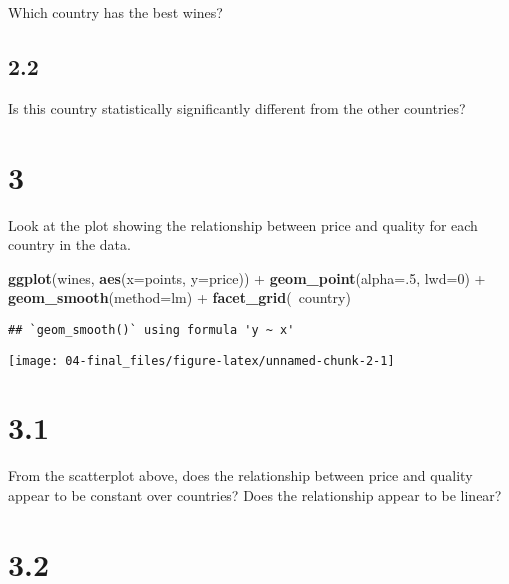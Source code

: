 \documentclass[]{tufte-handout}
\newenvironment{Shaded}{}{}
\newcommand{\DataTypeTok}[1]{\textcolor[rgb]{0.56,0.13,0.00}{#1}}
\newcommand{\DecValTok}[1]{\textcolor[rgb]{0.25,0.63,0.44}{#1}}
\newcommand{\KeywordTok}[1]{\textcolor[rgb]{0.00,0.44,0.13}{\textbf{#1}}}
\newcommand{\NormalTok}[1]{#1}
\newcommand{\OperatorTok}[1]{\textcolor[rgb]{0.40,0.40,0.40}{#1}}
\newcommand{\StringTok}[1]{\textcolor[rgb]{0.25,0.44,0.63}{#1}}
\begin{document}
Which country has the best wines?

\hypertarget{section-5}{%
\subsection{2.2}\label{section-5}}

Is this country statistically significantly different from the other
countries?

\hypertarget{section-6}{%
\section{3}\label{section-6}}

Look at the plot showing the relationship between price and quality for
each country in the data.

\begin{Shaded}
\begin{Highlighting}[]
\KeywordTok{ggplot}\NormalTok{(wines, }\KeywordTok{aes}\NormalTok{(}\DataTypeTok{x=}\NormalTok{points, }\DataTypeTok{y=}\NormalTok{price)) }\OperatorTok{+}\StringTok{ }
\StringTok{  }\KeywordTok{geom_point}\NormalTok{(}\DataTypeTok{alpha=}\NormalTok{.}\DecValTok{5}\NormalTok{, }\DataTypeTok{lwd=}\DecValTok{0}\NormalTok{) }\OperatorTok{+}\StringTok{ }
\StringTok{  }\KeywordTok{geom_smooth}\NormalTok{(}\DataTypeTok{method=}\NormalTok{lm) }\OperatorTok{+}\StringTok{ }
\StringTok{  }\KeywordTok{facet_grid}\NormalTok{(}\OperatorTok{~}\NormalTok{country) }
\end{Highlighting}
\end{Shaded}

\begin{verbatim}
## `geom_smooth()` using formula 'y ~ x'
\end{verbatim}

\begin{figure*}
\texttt{[image: 04-final\_files/figure-latex/unnamed-chunk-2-1]} \end{figure*}

\hypertarget{section-7}{%
\section{3.1}\label{section-7}}

From the scatterplot above, does the relationship between price and
quality appear to be constant over countries? Does the relationship
appear to be linear?

\hypertarget{section-8}{%
\section{3.2}\label{section-8}}
\end{document}
